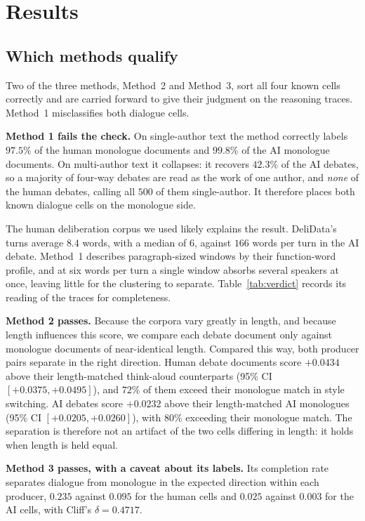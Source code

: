 \documentclass[10pt,twocolumn]{article}
\begin{document}
\section{Results}

\subsection{Which methods qualify}
Two of the three methods, Method~2 and Method~3, sort all four known cells correctly and are carried
forward to give their judgment on the reasoning traces. Method~1 misclassifies both dialogue cells.

\textbf{Method 1 fails the check.} On single-author text the method correctly labels $97.5\%$ of the
human monologue documents and $99.8\%$ of the AI monologue documents. On
multi-author text it collapses: it recovers $42.3\%$ of the AI debates, so a majority of four-way
debates are read as the work of one author, and \emph{none} of the human debates, calling all $500$
of them single-author. It therefore places both known dialogue cells on the monologue side.

The human deliberation corpus we used likely explains the result. DeliData's turns average $8.4$
words, with a median of $6$, against $166$ words per turn in the AI debate. Method~1 describes
paragraph-sized windows by their function-word profile, and at six words per turn a single window
absorbs several speakers at once, leaving little for the clustering to separate.
Table~\ref{tab:verdict} records its reading of the traces for completeness.

\textbf{Method 2 passes.} Because the corpora vary greatly in length, and because length influences
this score, we compare each debate document only against monologue documents of near-identical
length. Compared this way, both producer pairs separate in the right direction. Human debate
documents score $+0.0434$ above their length-matched think-aloud counterparts (95\% CI
$[+0.0375,+0.0495]$), and $72\%$ of them exceed their monologue match in style switching. AI debates score $+0.0232$
above their length-matched AI monologues (95\% CI $[+0.0205,+0.0260]$), with $80\%$ exceeding their
monologue match. The separation is therefore not an artifact of the two cells differing in length: it
holds when length is held equal.

\textbf{Method 3 passes, with a caveat about its labels.} Its completion rate separates dialogue from
monologue in the expected direction within each producer, $0.235$ against $0.095$ for the human cells
and $0.025$ against $0.003$ for the AI cells, with Cliff's $\delta=0.4717$.
\end{document}
